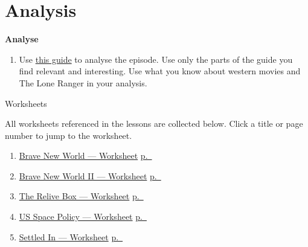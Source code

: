 \documentclass[11pt,a4paper,oneside]{book}
\newcommand{\tasktitle}[1]{{\color{blue}\bfseries #1}\par\smallskip}
\begin{document}
\section*{Analysis}
\begin{taskbox}
\tasktitle{Analyse}
\begin{enumerate}
\item Use \href{run:../../../classnotes/eng-c/notes/how-to-analyse.md}{this guide} to analyse the episode. Use only the parts of the guide you find relevant and interesting. Use what you know about western movies and The Lone Ranger in your analysis.
\end{enumerate}
\end{taskbox}

\clearpage{}
{\displayfont\color{navy}\fontsize{30}{34}\selectfont Worksheets\par}\vspace{6mm}
All worksheets referenced in the lessons are collected below. Click a title or page number to jump to the worksheet.\par
\begin{enumerate}
\item \hyperref[worksheet-1]{Brave New World — Worksheet} \hfill \hyperref[worksheet-1]{p.~\pageref*{worksheet-1}}
\item \hyperref[worksheet-2]{Brave New World II — Worksheet} \hfill \hyperref[worksheet-2]{p.~\pageref*{worksheet-2}}
\item \hyperref[worksheet-3]{The Relive Box — Worksheet} \hfill \hyperref[worksheet-3]{p.~\pageref*{worksheet-3}}
\item \hyperref[worksheet-4]{US Space Policy — Worksheet} \hfill \hyperref[worksheet-4]{p.~\pageref*{worksheet-4}}
\item \hyperref[worksheet-5]{Settled In — Worksheet} \hfill \hyperref[worksheet-5]{p.~\pageref*{worksheet-5}}
\end{enumerate}

\clearpage{}


\clearpage{}


\clearpage{}


\clearpage{}


\clearpage{}

\end{document}
